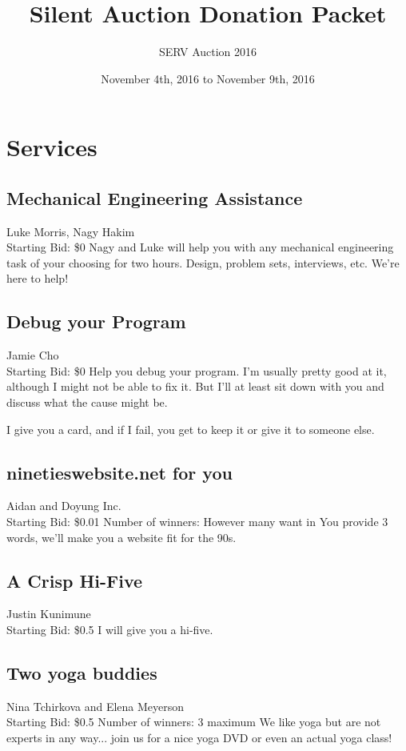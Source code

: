 \documentclass[11pt]{article}
\title{Silent Auction Donation Packet}
\author{SERV Auction 2016}
\date{November 4th, 2016 to November 9th, 2016}
\begin{document}
\maketitle
\section{Services}
\subsection{Mechanical Engineering Assistance}
Luke Morris, Nagy Hakim
\\
Starting Bid: \$0
\newline
Nagy and Luke will help you with any mechanical engineering task of your choosing for two hours. Design, problem sets, interviews, etc. We're here to help!
\subsection{Debug your Program}
Jamie Cho
\\
Starting Bid: \$0
\newline
Help you debug your program. I'm usually pretty good at it, although I might not be able to fix it. But I'll at least sit down with you and discuss what the cause might be.

I give you a card, and if I fail, you get to keep it or give it to someone else.
\subsection{ninetieswebsite.net for you}
Aidan and Doyung Inc.
\\
Starting Bid: \$0.01
\newline
Number of winners: However many want in
\newline
You provide 3 words, we'll make you a website fit for the 90s.
\subsection{A Crisp Hi-Five}
Justin Kunimune
\\
Starting Bid: \$0.5
\newline
I will give you a hi-five.
\subsection{Two yoga buddies}
Nina Tchirkova and Elena Meyerson
\\
Starting Bid: \$0.5
\newline
Number of winners: 3 maximum 
\newline
We like yoga but are not experts in any way... join us for a nice yoga DVD or even an actual yoga class!
\end{document}

